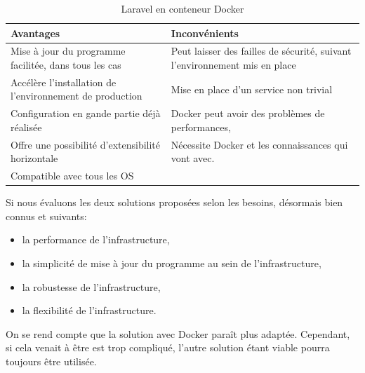 \documentclass[
    iai, %
    il, %
]{heig-tb}
\begin{document}
\begin{table}[h]
    \begin{center}
        \caption{Laravel en conteneur Docker \label{prod-laravel-docker}}
        \begin{tabularx}{1.0\textwidth} {X|X}
            Avantages                                                & Inconvénients                      \\ \hline
            Mise à jour du programme facilitée, dans tous les cas    & Peut laisser des failles de
            sécurité, suivant l'environnement mis en place                                                \\
            Accélère l'installation de l'environnement de production & Mise en place d'un service
            non trivial                                                                                   \\
            Configuration en gande partie déjà réalisée              & Docker peut avoir des problèmes de
            performances, \cite{labrecque}                                                                \\
            Offre une possibilité d'extensibilité horizontale        & Nécessite Docker et les
            connaissances qui vont avec. \cite{labrecque}                                                 \\
            Compatible avec tous les OS                              &                                    \\
        \end{tabularx}
    \end{center}
\end{table}

Si nous évaluons les deux solutions proposées selon les besoins, désormais bien connus et suivants:
\begin{itemize}
    \item la performance de l'infrastructure,
    \item la simplicité de mise à jour du programme au sein de l'infrastructure,
    \item la robustesse de l'infrastructure,
    \item la flexibilité de l'infrastructure.
\end{itemize}

On se rend compte que la solution avec Docker paraît plus adaptée. Cependant, si cela venait à être est trop compliqué, l'autre solution étant viable pourra toujours être utilisée.
\end{document}
